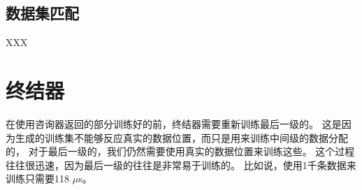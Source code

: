 




\subsection{数据集匹配}

XXX

\section{终结器}

在使用咨询器返回的部分训练好的{\model}前，终结器需要重新训练最后一级的{\model}。
这是因为生成的训练集不能够反应真实的数据位置，而只是用来训练中间级{\model}的数据分配的，
对于最后一级的{\model}，我们仍然需要使用真实的数据位置来训练这些{\model}。
这个过程往往很迅速，因为最后一级的往往是非常易于训练的{\lr}。
比如说，使用1千条数据来训练{\lr}只需要118 $\mu$s。


